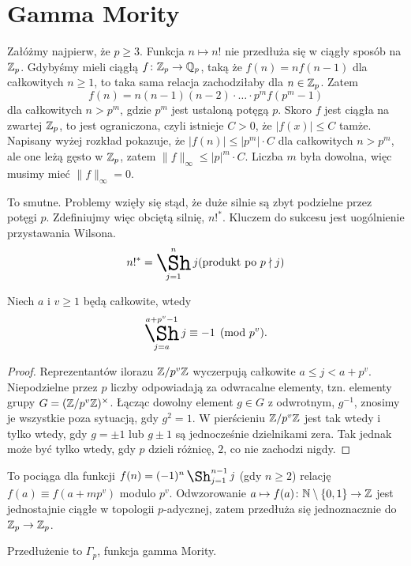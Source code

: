 \section{Gamma Mority}
Załóżmy  najpierw, że $p \ge 3$.
Funkcja $n \mapsto n!$ nie przedłuża się w ciągły sposób na $\mathbb Z_p$. Gdybyśmy mieli ciągłą $f \colon \mathbb Z_p \to \mathbb Q_p$, taką że $f(n) = nf(n-1)$ dla całkowitych $n \ge 1$, to taka sama relacja zachodziłaby dla $n \in \mathbb Z_p$.
Zatem
\[
	f(n) = n (n-1)(n-2) \cdot \ldots \cdot p^m f(p^m-1)
\]
dla całkowitych $n > p^m$, gdzie $p^m$ jest ustaloną potęgą $p$.
Skoro $f$ jest ciągła na zwartej $\mathbb Z_p$, to jest ograniczona, czyli istnieje $C > 0$, że $|f(x)| \le C$ tamże.
Napisany wyżej rozkład pokazuje, że $|f(n)| \le |p^m| \cdot C$ dla całkowitych $n > p^m$, ale one leżą gęsto w $\mathbb Z_p$, zatem $\|f\|_\infty \le |p|^m \cdot C$.
Liczba $m$ była dowolna, więc musimy mieć $\|f\|_\infty = 0$.

To smutne. Problemy wzięły się stąd, że duże silnie są zbyt podzielne przez potęgi $p$.
Zdefiniujmy więc {obciętą silnię}, $n!^*$.
Kluczem do sukcesu jest uogólnienie przystawania Wilsona.
\[
	n!^* = \shaprod_{j = 1}^n j \hfill \text{(produkt po } p \nmid j\textrm{)}
\]

\begin{fakt}
	Niech $a$ i $v \ge 1$ będą całkowite, wtedy
	\[
		\shaprod_{j=a}^{a+p^v-1} j \equiv -1 \pmod {p^v}.
	\]
\end{fakt}

\begin{proof}
	Reprezentantów ilorazu $\mathbb Z/p^v \mathbb Z$ wyczerpują całkowite $a \le j < a + p^v$.
	Niepodzielne przez $p$ liczby odpowiadają za odwracalne elementy, tzn. elementy grupy $G = (\mathbb Z/p^v\mathbb Z)^\times$.
	Łącząc dowolny element $g \in G$ z odwrotnym, $g^{-1}$, znosimy je wszystkie poza sytuacją, gdy $g^2 = 1$.
	W pierścieniu $\mathbb Z/p^v \mathbb Z$ jest tak wtedy i tylko wtedy, gdy $g = \pm 1$ lub $g \pm 1$ są jednocześnie dzielnikami zera.
	Tak jednak może być tylko wtedy, gdy $p$ dzieli różnicę, $2$, co nie zachodzi nigdy.
\end{proof}

To pociąga dla funkcji $f(n) = (-1)^n \shaprod_{j=1}^{n-1} j$ (gdy $n \ge 2$) relację $f(a) \equiv f(a+mp^v)$ modulo $p^v$.
Odwzorowanie $a \mapsto f(a) \colon \mathbb N \setminus\{0,1\} \to \mathbb Z$ jest jednostajnie ciągłe w topologii $p$-adycznej, zatem przedłuża się jednoznacznie do $\mathbb Z_p \to \mathbb Z_p$.

\begin{definicja}
	Przedłużenie to $\Gamma_p$, funkcja gamma Mority.
\end{definicja}

